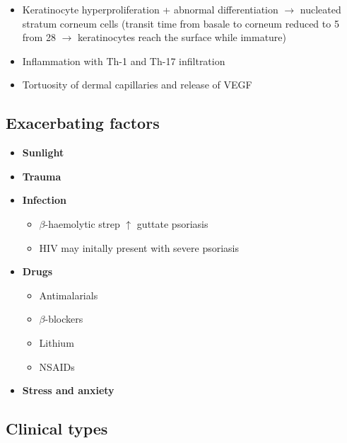 \documentclass[
  12pt,
]{memoir}
\providecommand{\tightlist}{%
  \setlength{\itemsep}{0pt}\setlength{\parskip}{0pt}}
\begin{document}
\begin{itemize}
\tightlist
\item
  Keratinocyte hyperproliferation + abnormal differentiation
  \(\rightarrow\) nucleated stratum corneum cells (transit time from
  basale to corneum reduced to 5 from 28 \(\rightarrow\) keratinocytes
  reach the surface while immature)
\item
  Inflammation with Th-1 and Th-17 infiltration
\item
  Tortuosity of dermal capillaries and release of VEGF
\end{itemize}

\hypertarget{exacerbating-factors}{%
\subsection{Exacerbating factors}\label{exacerbating-factors}}

\begin{itemize}
\tightlist
\item
  \textbf{Sunlight}
\item
  \textbf{Trauma}
\item
  \textbf{Infection}

  \begin{itemize}
  \tightlist
  \item
    \(\beta\)-haemolytic strep \(\uparrow\) guttate psoriasis
  \item
    HIV may initally present with severe psoriasis
  \end{itemize}
\item
  \textbf{Drugs}

  \begin{itemize}
  \tightlist
  \item
    Antimalarials
  \item
    \(\beta\)-blockers
  \item
    Lithium
  \item
    NSAIDs
  \end{itemize}
\item
  \textbf{Stress and anxiety}
\end{itemize}

\hypertarget{clinical-types}{%
\subsection{Clinical types}\label{clinical-types}}
\end{document}
